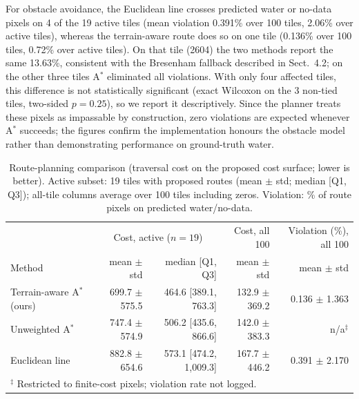 \documentclass[runningheads]{llncs}
\begin{document}
For obstacle avoidance, the Euclidean line crosses predicted water or no-data pixels on 4 of the 19 active tiles (mean violation 0.391\% over 100 tiles, 2.06\% over active tiles), whereas the terrain-aware route does so on one tile (0.136\% over 100 tiles, 0.72\% over active tiles). On that tile (2604) the two methods report the same 13.63\%, consistent with the Bresenham fallback described in Sect.~4.2; on the other three tiles A$^{*}$ eliminated all violations. With only four affected tiles, this difference is not statistically significant (exact Wilcoxon on the 3 non-tied tiles, two-sided $p=0.25$), so we report it descriptively. Since the planner treats these pixels as impassable by construction, zero violations are expected whenever A$^{*}$ succeeds; the figures confirm the implementation honours the obstacle model rather than demonstrating performance on ground-truth water.

\begin{table}[t]
\caption{Route-planning comparison (traversal cost on the proposed cost surface; lower is better). Active subset: 19 tiles with proposed routes (mean $\pm$ std; median [Q1, Q3]); all-tile columns average over 100 tiles including zeros. Violation: \% of route pixels on predicted water/no-data.}\label{tab:route}
\centering
\scriptsize
\setlength{\tabcolsep}{2pt}
\begin{tabular}{lrrrr}
\toprule
 & \multicolumn{2}{c}{Cost, active ($n=19$)} & Cost, all 100 & Violation (\%), all 100\\
Method & mean $\pm$ std & median [Q1, Q3] & mean $\pm$ std & mean $\pm$ std\\
\midrule
Terrain-aware A$^*$ (ours) & 699.7 $\pm$ 575.5 & 464.6 [389.1, 763.3] & 132.9 $\pm$ 369.2 & 0.136 $\pm$ 1.363 \\
Unweighted A$^*$ & 747.4 $\pm$ 574.9 & 506.2 [435.6, 866.6] & 142.0 $\pm$ 383.3 & n/a$^{\ddagger}$ \\
Euclidean line & 882.8 $\pm$ 654.6 & 573.1 [474.2, 1,009.3] & 167.7 $\pm$ 446.2 & 0.391 $\pm$ 2.170 \\
\bottomrule
\multicolumn{5}{l}{$^{\ddagger}$ Restricted to finite-cost pixels; violation rate not logged.}
\end{tabular}
\end{table}
\end{document}
